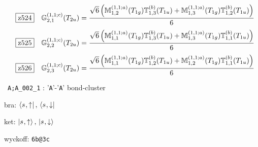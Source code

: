 \documentclass[fleqn,10pt,landscape]{jsarticle}
\begin{document}
\begin{dmath*}
\hspace*{3mm}\fbox{z524}\quad \mathbb{G}_{2,1}^{(1,1;c)}(T_{2u})=\frac{\sqrt{6} \left(\mathbb{M}_{1,2}^{(1,1;a)}(T_{1g}) \mathbb{T}_{1,3}^{(b)}(T_{1u}) + \mathbb{M}_{1,3}^{(1,1;a)}(T_{1g}) \mathbb{T}_{1,2}^{(b)}(T_{1u})\right)}{6}
\end{dmath*}
\begin{dmath*}
\hspace*{3mm}\fbox{z525}\quad \mathbb{G}_{2,2}^{(1,1;c)}(T_{2u})=\frac{\sqrt{6} \left(\mathbb{M}_{1,1}^{(1,1;a)}(T_{1g}) \mathbb{T}_{1,3}^{(b)}(T_{1u}) + \mathbb{M}_{1,3}^{(1,1;a)}(T_{1g}) \mathbb{T}_{1,1}^{(b)}(T_{1u})\right)}{6}
\end{dmath*}
\begin{dmath*}
\hspace*{3mm}\fbox{z526}\quad \mathbb{G}_{2,3}^{(1,1;c)}(T_{2u})=\frac{\sqrt{6} \left(\mathbb{M}_{1,1}^{(1,1;a)}(T_{1g}) \mathbb{T}_{1,2}^{(b)}(T_{1u}) + \mathbb{M}_{1,2}^{(1,1;a)}(T_{1g}) \mathbb{T}_{1,1}^{(b)}(T_{1u})\right)}{6}
\end{dmath*}
\vspace{5mm}

\noindent\textbullet\, \texttt{A;A_002_1} : '\texttt{A}'-'\texttt{A}' bond-cluster

\noindent\quad * bra: $\bra{s_{},\uparrow},\, \bra{s_{},\downarrow}$

\noindent\quad * ket: $\ket{s_{},\uparrow},\, \ket{s_{},\downarrow}$

\noindent\quad * wyckoff: \texttt{6b@3c}
\end{document}
